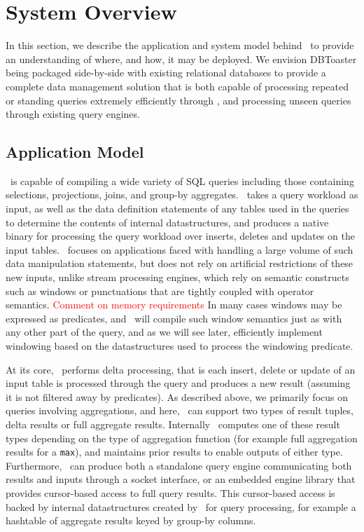 \section{System Overview}
In this section, we describe the application and system model behind \compiler\
to provide an understanding of where, and how, it may be deployed. We envision
DBToaster being packaged side-by-side with existing relational databases to
provide a complete data management solution that is both capable of processing
repeated or standing queries extremely efficiently through \compiler, and
processing unseen queries through existing query engines. 

\subsection{Application Model}
\compiler\ is capable of compiling a wide variety of SQL queries including those
containing selections, projections, joins, and group-by aggregates. \compiler\
takes a query workload as input, as well as the data definition statements of any
tables used in the queries to determine the contents of internal datastructures,
and produces a native binary for processing the query workload over inserts,
deletes and updates on the input tables. \compiler\ focuses on applications faced
with handling a large volume of such data manipulation statements, but does not
rely on artificial restrictions of these new inputs, unlike stream processing
engines, which rely on semantic constructs such as windows or punctuations that
are tightly coupled with operator semantics.
\textcolor{red}{Comment on memory requirements}
In many cases windows may be expressed as predicates, and \compiler\ will compile
such window semantics just as with any other part of the query, and as we will
see later, efficiently implement windowing based on the datastructures used to
process the windowing predicate.

At its core, \compiler\ performs delta processing, that is each insert, delete
or update of an input table is processed through the query and produces a new
result (assuming it is not filtered away by predicates). As described above, we
primarily focus on queries involving aggregations, and here, \compiler\ can
support two types of result tuples, delta results or full aggregate results.
Internally \compiler\ computes one of these result types depending
on the type of aggregation function (for example full aggregation
results for a \texttt{max}), and maintains prior results to enable outputs
of either type. Furthermore, \compiler\ can produce both a standalone query
engine communicating both results and inputs through a socket interface, or an
embedded engine library that provides cursor-based access to full query results.
This cursor-based access is backed by internal datastructures created by
\compiler\ for query processing, for example a hashtable of aggregate results
keyed by group-by columns.


